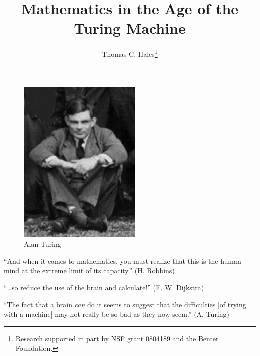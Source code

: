 \documentclass{llncs}
\begin{document}
\title{Mathematics in the Age of the Turing Machine}
\author{Thomas C. Hales\thanks{{Research supported in part by NSF grant 0804189 and the Benter Foundation.}}}
\maketitle



\section*{}

\begin{figure}[h!]
  \centering
\includegraphics[scale=0.8]{alan-turing-223x300.jpg}
  \caption{Alan Turing}
\end{figure}


{

\narrower

\it

``And when it comes to mathematics, you must realize that this is the human mind
at the extreme limit of its capacity.'' (H. Robbins) 

\smallskip
\noindent
``\ldots so reduce the use of
the brain and calculate!'' (E. W. Dijkstra)  

\smallskip
\noindent
``The fact that a brain {\it can} do it seems to suggest that the
difficulties [of trying with a machine] may not really be so bad as they now
seem.''  (A. Turing)

}
\end{document}
